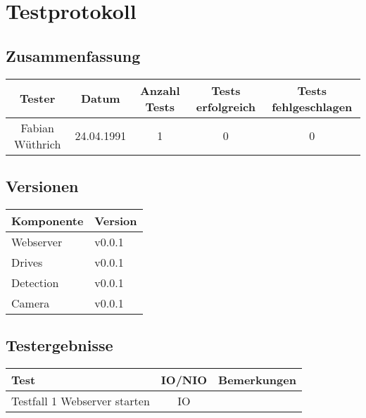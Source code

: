 \section{Testprotokoll}

\subsection{Zusammenfassung}

\begin{table}[h!]
	\centering
	\renewcommand{\arraystretch}{1.5}
	\begin{tabular}{|c|c|c|c|c|}
		\hline \textbf{Tester} & \textbf{Datum} & \textbf{Anzahl Tests} & \textbf{Tests erfolgreich} & \textbf{Tests fehlgeschlagen} \\
		\hline Fabian Wüthrich & 24.04.1991 & 1 & 0 & 0 \\ 
		\hline 
	\end{tabular}
\end{table}

\subsection{Versionen}

\begin{table}[h!]
	\centering
	\renewcommand{\arraystretch}{1.5}
	\begin{tabular}{|l|l|}
		\hline \textbf{Komponente} & \textbf{Version} \\
		\hline Webserver & v0.0.1 \\
		\hline Drives & v0.0.1 \\
		\hline Detection & v0.0.1 \\
		\hline Camera & v0.0.1 \\
		\hline 
	\end{tabular}
\end{table}

\subsection{Testergebnisse}

\begin{table}[h!]
	\centering
	\renewcommand{\arraystretch}{1.5}
	\begin{tabular}{|l|c|p{8cm}|}
		\hline \textbf{Test} & \textbf{IO/NIO} & \textbf{Bemerkungen} \\
		\hline Testfall 1 Webserver starten & IO & \\
		\hline 
	\end{tabular}
\end{table}